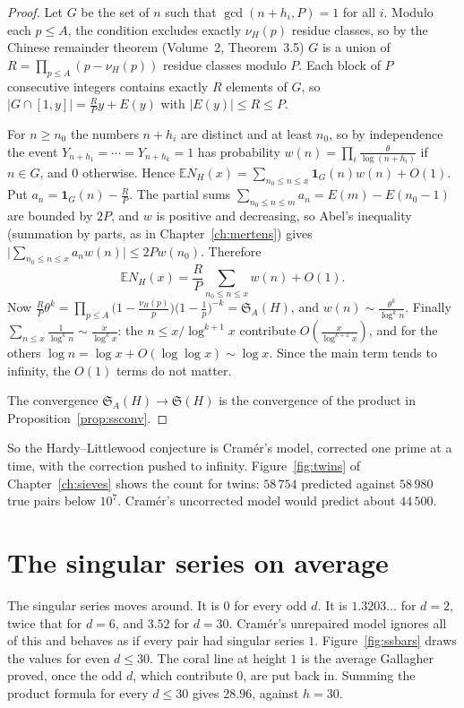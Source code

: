 \begin{proof}
Let $G$ be the set of $n$ such that $\gcd(n+h_i,P)=1$ for all $i$. Modulo each $p\le A$, the condition excludes exactly $\nu_H(p)$ residue classes, so by the Chinese remainder theorem (Volume~2, Theorem~3.5) $G$ is a union of
$R=\prod_{p\le A}(p-\nu_H(p))$ residue classes modulo $P$. Each block of $P$ consecutive integers contains exactly $R$ elements of $G$, so $|G\cap[1,y]|=\frac RPy+E(y)$ with $|E(y)|\le R\le P$.

For $n\ge n_0$ the numbers $n+h_i$ are distinct and at least $n_0$, so by independence the event $Y_{n+h_1}=\cdots=Y_{n+h_k}=1$ has probability $w(n)=\prod_i\frac\theta{\log(n+h_i)}$ if $n\in G$, and $0$ otherwise.
Hence $\mathbb EN_H(x)=\sum_{n_0\le n\le x}\mathbf 1_G(n)w(n)+O(1)$. Put $a_n=\mathbf 1_G(n)-\frac RP$. The partial sums $\sum_{n_0\le n\le m}a_n=E(m)-E(n_0-1)$ are bounded by $2P$, and $w$ is positive and decreasing, so Abel's
inequality (summation by parts, as in Chapter~\ref{ch:mertens}) gives $\bigl|\sum_{n_0\le n\le x}a_nw(n)\bigr|\le2Pw(n_0)$. Therefore
\[
\mathbb EN_H(x)=\frac RP\sum_{n_0\le n\le x}w(n)+O(1).
\]
Now $\frac RP\theta^k=\prod_{p\le A}\bigl(1-\frac{\nu_H(p)}p\bigr)\bigl(1-\frac1p\bigr)^{-k}=\mathfrak S_A(H)$, and $w(n)\sim\frac{\theta^k}{\log^kn}$. Finally $\sum_{n\le x}\frac1{\log^kn}\sim\frac x{\log^kx}$: the
$n\le x/\log^{k+1}x$ contribute $O(\frac x{\log^{k+1}x})$, and for the others $\log n=\log x+O(\log\log x)\sim\log x$. Since the main term tends to infinity, the $O(1)$ terms do not matter.

The convergence $\mathfrak S_A(H)\to\mathfrak S(H)$ is the convergence of the product in Proposition~\ref{prop:ssconv}.
\end{proof}

So the Hardy--Littlewood conjecture is Cramér's model, corrected one prime at a time, with the correction pushed to infinity. Figure~\ref{fig:twins} of Chapter~\ref{ch:sieves} shows the count for twins: $58\,754$ predicted against $58\,980$ true pairs below $10^7$. Cramér's uncorrected model would predict about $44\,500$.

\section{The singular series on average}

The singular series moves around. It is $0$ for every odd $d$. It is $1.3203\ldots$ for $d=2$, twice that for $d=6$, and $3.52$ for $d=30$. Cramér's unrepaired model ignores all of this and behaves as if every pair had singular series $1$. Figure~\ref{fig:ssbars} draws the values for even $d\le30$. The coral line at height $1$ is the average Gallagher proved, once the odd $d$, which contribute $0$, are put back in. Summing the product formula for every $d\le30$ gives $28.96$, against $h=30$.

